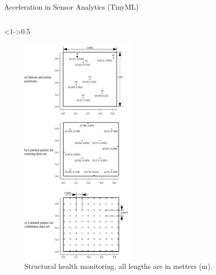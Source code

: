 \begin{frame}{Acceleration in Sensor Analytics (TinyML)}
	\begin{columns}[c] %
		
		\begin{column}<1->{0.5\textwidth}\centering
			\begin{figure}
				\includegraphics[width=0.5\textwidth]{../chapters/cnn_accelerator/figures/histograms/data_set.pdf} %
				\caption{\scriptsize Structural health monitoring, all lengths are in metters (m).}
			\end{figure}
		\end{column}
		

\end{columns}
\end{frame}
